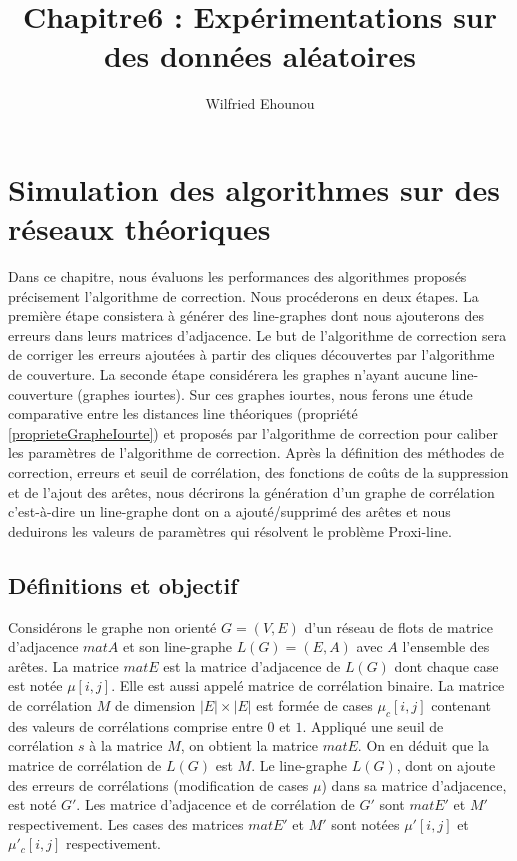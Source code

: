 \documentclass[onecolumn, 12pt]{book}
\title{Chapitre6 : Exp\'erimentations sur des donn\'ees al\'eatoires}
\author{Wilfried Ehounou}
\date{\oldstylenums{\today}}
\begin{document}
\maketitle
\tableofcontents

\chapter{Simulation des algorithmes sur des r\'eseaux th\'eoriques}
Dans ce chapitre, nous \'evaluons les performances des algorithmes propos\'es pr\'ecisement l'algorithme de correction. Nous proc\'ederons en deux \'etapes. 
La premi\`ere \'etape consistera  \`a g\'en\'erer des line-graphes dont nous ajouterons des erreurs dans leurs matrices d'adjacence. Le but de l'algorithme de correction sera de corriger les erreurs ajout\'ees \`a partir des cliques d\'ecouvertes par l'algorithme de couverture. 
La seconde \'etape consid\'erera les graphes n'ayant aucune line-couverture (graphes iourtes). Sur ces graphes iourtes, nous ferons  une \'etude comparative entre les distances line th\'eoriques (propri\'et\'e \ref{proprieteGrapheIourte}) et propos\'es par l'algorithme de correction pour caliber les param\`etres de l'algorithme de correction. \newline
Apr\`es la d\'efinition des m\'ethodes de correction, erreurs et seuil de corr\'elation, des fonctions de co\^uts de la suppression et de l'ajout des ar\^etes, nous d\'ecrirons la g\'en\'eration d'un graphe de corr\'elation c'est-\`a-dire un line-graphe dont on a ajout\'e/supprim\'e des ar\^etes et nous deduirons les valeurs de param\`etres qui r\'esolvent le probl\`eme Proxi-line. 

\section{D\'efinitions et objectif}
Consid\'erons le graphe non orient\'e $G = (V,E)$ d'un r\'eseau de flots de matrice d'adjacence $matA$ et son line-graphe $L(G) = (E, A)$ avec $A$ l'ensemble des ar\^etes.
La matrice $matE$ est la matrice d'adjacence de $L(G)$ dont chaque case est not\'ee $\mu[i,j]$. Elle est aussi appel\'e matrice de corr\'elation binaire.
La matrice de corr\'elation $M$ de dimension $|E| \times |E|$ est form\'ee de cases $\mu_c[i,j]$ contenant des valeurs de corr\'elations comprise entre $0$ et $1$. 
Appliqu\'e une seuil de corr\'elation  $s$ \`a la matrice $M$, on obtient la matrice $matE$. On en d\'eduit que la matrice de corr\'elation de $L(G)$ est $M$. \newline
Le line-graphe $L(G)$, dont on ajoute des erreurs de corr\'elations (modification de cases $\mu$) dans sa matrice d'adjacence, est not\'e $G'$. Les matrice d'adjacence et de corr\'elation de $G'$ sont $matE'$ et $M'$ respectivement. Les cases des matrices $matE'$ et $M'$ sont not\'ees  $\mu'[i,j]$ et $\mu'_c[i,j]$ respectivement.
 
\end{document}
